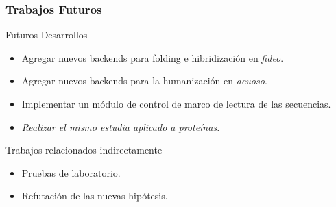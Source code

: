       \begin{frame}\frametitle{\textbf{Trabajos Futuros}}
        \begin{block}{Futuros Desarrollos}
          \begin{itemize}
            \item Agregar nuevos backends para folding e hibridización en \emph{fideo}.
            \item Agregar nuevos backends para la humanización en \emph{acuoso}.
            \item Implementar un módulo de control de marco de lectura de las secuencias.
            \item \emph{Realizar el mismo estudia aplicado a proteínas.}
          \end{itemize} 
        \end{block}
        \begin{block}{Trabajos relacionados indirectamente}
          \begin{itemize}
            \item Pruebas de laboratorio.
            \item Refutación de las nuevas hipótesis.
          \end{itemize} 
        \end{block}
      \end{frame}    
